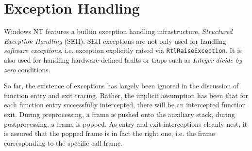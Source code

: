%
%
%
%  
  
\section{Exception Handling}
\label{sec:ExceptionHandling}
Windows NT features a builtin exception handling infrastructure, 
\emph{Structured Exception Handling} (SEH). SEH exceptions are not only
used for handling \emph{software exceptions}, i.e. exception explicitly
raised via \verb|RtlRaiseException|. It is also used for handling hardware-defined
faults or traps such as \emph{Integer divide by zero} conditions.

So far, the existence of exceptions has largely been ignored in the
discussion of function entry and exit tracing. Rather, the implicit
assumption has been that for each function entry successfully intercepted,
there will be an intercepted function exit. During preprocessing, a frame is
pushed onto the auxiliary stack, during postprocessing, a frame is popped.
As entry and exit interceptions cleanly nest, it is assured that the popped
frame is in fact the right one, i.e. the frame corresponding to the specific
call frame.

